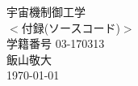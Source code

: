 \documentclass[class=article, crop=false, dvipdfmx, fleqn]{standalone}
\begin{document}
  \begin{titlepage}
  \begin{center}
  \vspace*{80truept}
  {\huge 宇宙機制御工学}\\ %
  \vspace{15truept}
  {\huge $<$付録(ソースコード)$>$} \\
  \vspace{10truept}
  \vspace{150truept}
  {\large 学籍番号 03-170313}\\ %
  \vspace{10truept}
  {\large 飯山敬大}\\ %
  \vspace{10truept}
  {\large \today}\\ %
  \end{center}
  \end{titlepage}
\end{document}
